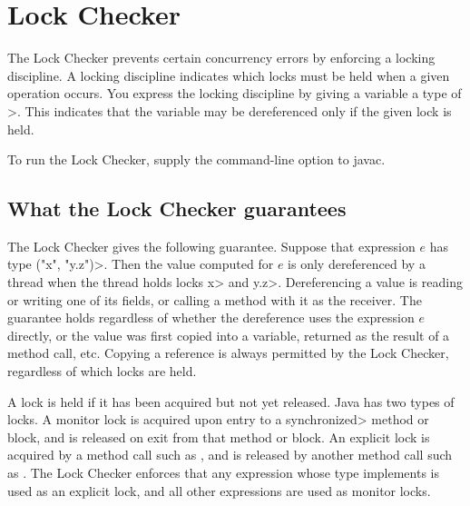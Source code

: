\htmlhr
\chapter{Lock Checker\label{lock-checker}}

The Lock Checker prevents certain concurrency errors by enforcing a
locking discipline.  A locking discipline indicates which locks must be held
when a given operation occurs.  You express the locking discipline by
giving a variable a type of
\<>.
This indicates that the variable may
be dereferenced only if the given lock is held.


To run the Lock Checker, supply the
command-line option to javac.


\section{What the Lock Checker guarantees\label{lock-guarantees}}

The Lock Checker gives the following guarantee.
Suppose that expression $e$ has type
\<(\ttlcb"x", "y.z"\ttrcb)>.
Then the value computed for $e$ is only dereferenced by a thread when the
thread holds locks \<x> and \<y.z>.
Dereferencing a value is reading or writing one of its fields, or
calling a method with it as the receiver.
The guarantee holds regardless of whether the dereference uses the expression $e$
directly, or the value was first copied into a variable, returned as the
result of a method call, etc.
Copying a reference is always
permitted by the Lock Checker, regardless of which locks are held.

A lock is held if it has been acquired but not yet released.
Java has two types of locks.
A monitor lock is acquired upon entry to a \<synchronized> method or block,
and is released on exit from that method or block.
An explicit lock is acquired by a method call such as
,
and is released by another method call such as
.
The Lock Checker enforces that any expression whose type implements
 is used as an
explicit lock, and all other expressions are used as monitor locks.

